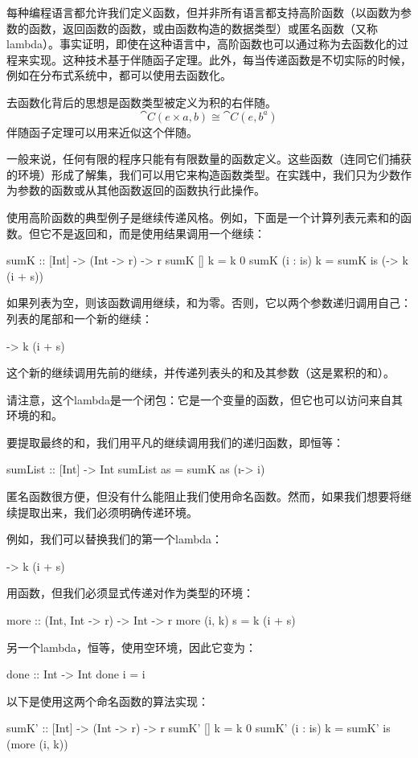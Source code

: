 \documentclass[DaoFP]{subfiles}
\begin{document}
    每种编程语言都允许我们定义函数，但并非所有语言都支持高阶函数（以函数为参数的函数，返回函数的函数，或由函数构造的数据类型）或匿名函数（又称lambda）。事实证明，即使在这种语言中，高阶函数也可以通过称为去函数化的过程来实现。这种技术基于伴随函子定理。此外，每当传递函数是不切实际的时候，例如在分布式系统中，都可以使用去函数化。

    去函数化背后的思想是函数类型被定义为积的右伴随。
    \[ \cat C(e \times a, b) \cong \cat C(e, b^a) \]
    伴随函子定理可以用来近似这个伴随。

    一般来说，任何有限的程序只能有有限数量的函数定义。这些函数（连同它们捕获的环境）形成了解集，我们可以用它来构造函数类型。在实践中，我们只为少数作为参数的函数或从其他函数返回的函数执行此操作。

    使用高阶函数的典型例子是继续传递风格。例如，下面是一个计算列表元素和的函数。但它不是返回和，而是使用结果调用一个继续：
    \begin{haskell}
        sumK :: [Int] -> (Int -> r) -> r
        sumK [] k = k 0
        sumK (i : is) k =
        sumK is (\s -> k (i + s))
    \end{haskell}
    如果列表为空，则该函数调用继续，和为零。否则，它以两个参数递归调用自己：列表的尾部和一个新的继续：
    \begin{haskell}
        \s -> k (i + s)
    \end{haskell}
    这个新的继续调用先前的继续，并传递列表头的和及其参数（这是累积的和）。

    请注意，这个lambda是一个闭包：它是一个变量的函数，但它也可以访问来自其环境的和。

    要提取最终的和，我们用平凡的继续调用我们的递归函数，即恒等：
    \begin{haskell}
        sumList :: [Int] -> Int
        sumList as = sumK as (\i -> i)
    \end{haskell}

    匿名函数很方便，但没有什么能阻止我们使用命名函数。然而，如果我们想要将继续提取出来，我们必须明确传递环境。

    例如，我们可以替换我们的第一个lambda：
    \begin{haskell}
        \s -> k (i + s)
    \end{haskell}
    用函数，但我们必须显式传递对作为类型的环境：
    \begin{haskell}
        more :: (Int, Int -> r) -> Int -> r
        more (i, k) s = k (i + s)
    \end{haskell}
    另一个lambda，恒等，使用空环境，因此它变为：
    \begin{haskell}
        done :: Int -> Int
        done i = i
    \end{haskell}
    以下是使用这两个命名函数的算法实现：
    \begin{haskell}
        sumK' :: [Int] -> (Int -> r) -> r
        sumK' [] k = k 0
        sumK' (i : is) k =
        sumK' is (more (i, k))
    \end{haskell}
\end{document}
